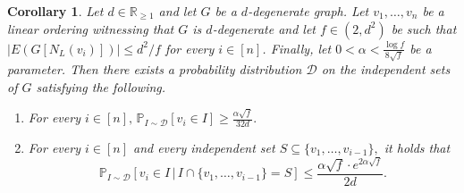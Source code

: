 \documentclass[10pt]{amsart}
\newtheorem{corollary}[theorem]{Corollary}
\theoremstyle{definition}
\newcommand{\calD}{\mathcal{D}}
\renewcommand{\Pr}{\mathbb{P}}
\begin{document}
\begin{corollary} \label{cor:sparseleft}
    Let $d\in \mathbb{R}_{\ge 1}$ and let $G$ be a $d$-degenerate graph. Let $v_1,\ldots,v_n$ be a linear ordering witnessing that $G$ is $d$-degenerate and let $f\in (2,d^2)$ be such that $|E(G[N_L(v_i)])|\le d^2/f$ for every $i \in [n]$. Finally, let $0<\alpha<\frac{\log f}{8\sqrt{f}}$ be a parameter. Then there exists a probability distribution $\mathcal{D}$ on the independent sets of $G$ satisfying the following.

    \begin{enumerate}[label=\alph*)]
        \item \label{prop:large-prob2} For every $i \in [n], \, \Pr_{I \sim \calD}[v_i \in I] \ge \frac{\alpha\sqrt{f}}{32 d}.$
        \item \label{prop:prob-not-too-big2} For every $i \in [n]$ and every independent set $S \subseteq \{v_1, \dots, v_{i-1}\},$ it holds that
        \[ \Pr_{I \sim \calD}[v_i \in I \, \vert \, I \cap \{v_1, \dots, v_{i-1}\} = S] \le \frac{\alpha\sqrt{f} \cdot e^{2 \alpha \sqrt{f}}}{2d}. \]
    \end{enumerate}
    \end{corollary}
\end{document}

